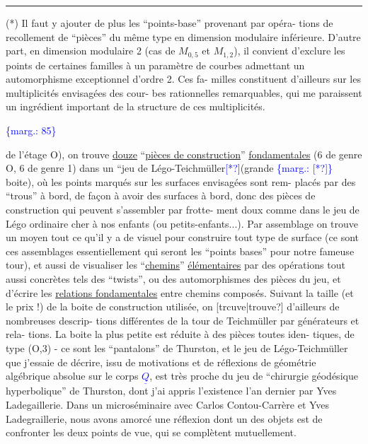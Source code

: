 \documentclass[11pt]{article}
\newcommand{\scanpage}[1]{\par\bigskip\noindent{\small\sffamily[scan #1]}\par}
\newcommand{\mspage}[1]{{\small\sffamily[p.\,#1]}}
\newcommand{\hand}[1]{\textcolor{blue}{#1}}
\newcommand{\margin}[1]{\textcolor{blue}{\{\textsf{marg.:} #1\}}}
\newcommand{\uline}[1]{\underline{#1}}
\newcommand{\unsure}[1]{[#1?]}
\begin{document}
\rule{4cm}{0.4pt}

(*) Il faut y ajouter de plus les ``points-base'' provenant par opéra-%
tions de recollement de ``pièces'' du même type en dimension modulaire
inférieure. D'autre part, en dimension modulaire 2 (cas de $M_{0,5}$ et $M_{1,2}$),
il convient d'exclure les points de certaines familles à un paramètre
de courbes admettant un automorphisme exceptionnel d'ordre 2. Ces fa-%
milles constituent d'ailleurs sur les multiplicités envisagées des cour-%
bes rationnelles remarquables, qui me paraissent un ingrédient important
de la structure de ces multiplicités.

\margin{85}

\clearpage
\scanpage{119/86}
\mspage{8}

de l'étage O), on trouve \uline{douze} ``\uline{pièces de construction}'' \uline{fondamentales}
(6 de genre O, 6 de genre 1) dans un ``jeu de Légo-Teichmüller\hand{\unsure{*}}(grande \margin{\unsure{*}}
boite), où les points marqués sur les surfaces envisagées sont rem-%
placés par des ``trous'' à bord, de façon à avoir des surfaces à bord,
donc des pièces de construction qui peuvent s'assembler par frotte-%
ment doux comme dans le jeu de Légo ordinaire cher à nos enfants
(ou petits-enfants...). Par assemblage on trouve un moyen tout ce
qu'il y a de visuel pour construire tout type de surface (ce sont
ces assemblages essentiellement qui seront les ``points bases'' pour
notre fameuse tour), et aussi de visualiser les ``\uline{chemins}'' \uline{élémentaires}
par des opérations tout aussi concrètes tels des ``twists'', ou des
automorphismes des pièces du jeu, et d'écrire les \uline{relations fondamentales}
entre chemins composés. Suivant la taille (et le prix !) de la boite
de construction utilisée, on \unsure{trcuve|trouve} d'ailleurs de nombreuses descrip-%
tions différentes de la tour de Teichmüller par générateurs et rela-%
tions. La boite la plus petite est réduite à des pièces toutes iden-%
tiques, de type (O,3) - ce sont les ``pantalons'' de Thurston, et le
jeu de Légo-Teichmüller que j'essaie de décrire, issu de motivations
et de réflexions de géométrie algébrique absolue sur le corps \hand{$\underline{Q}$},
est très proche du jeu de ``chirurgie géodésique hyperbolique'' de
Thurston, dont j'ai appris l'existence l'an dernier par Yves Ladegaillerie.
Dans un microséminaire avec Carlos Contou-Carrère et Yves Ladegraillerie,
nous avons amorcé une réflexion dont un des objets est de confronter
les deux points de vue, qui se complètent mutuellement.
\end{document}
